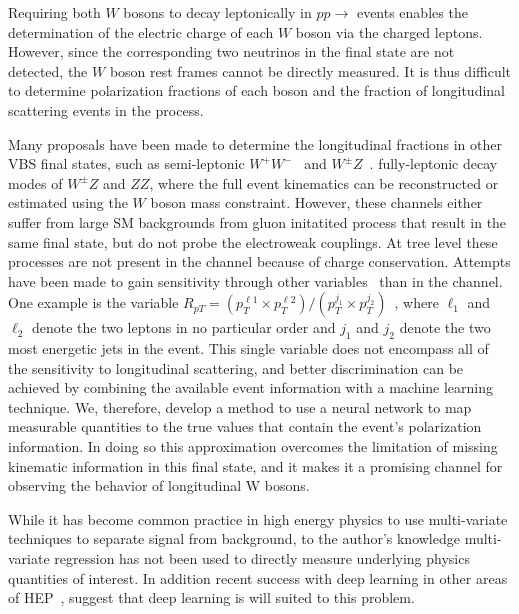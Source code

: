 Requiring both $W$ bosons to decay leptonically in  $pp
\to$ \ssWW events enables the determination of the electric charge of
each $W$ boson via the charged leptons. However, since the
corresponding two neutrinos in the final state are not detected, the
$W$ boson rest frames cannot be directly measured.  It is thus
difficult to determine polarization fractions of each boson and
the fraction of longitudinal scattering events in the \ssWW process.

Many proposals have been made to determine the longitudinal fractions in other VBS final states, such as semi-leptonic
$W^+W^-$~\cite{Han:2009em} and $W^\pm Z$~\cite{VBSCuts1}.
fully-leptonic decay modes of $W^\pm Z$ and $ZZ$, where the full
event kinematics can be reconstructed or estimated using the $W$ boson mass constraint. 
However, these channels either suffer from large SM backgrounds from gluon initatited process that result in the same final state, but do not probe the electroweak couplings. At tree level these processes are not present in the \ssWW channel because of charge conservation. Attempts have been made 
to gain sensitivity through other variables~\cite{VBSCuts1,Doroba:2012pd} than \ts in the \ssWW
channel. One example is the variable $R_{pT}=(p_{T}^{\ell 1} \times
p_{T}^{\ell 2}) / (p_T^{j_1} \times p_T^{j_2})$~\cite{Doroba:2012pd},
where $\ell_1$ and $\ell_2$ denote the two leptons in no particular
order and $j_1$ and $j_2$ denote the two most energetic jets in the
event. This single variable does not encompass all of the
sensitivity to longitudinal scattering, and better discrimination can
be achieved by combining the available event information with a
machine learning technique. We, therefore, develop a method to use a
neural network to map measurable quantities to the true \cts values
that contain the event's polarization information. In doing so this
approximation overcomes the limitation of missing kinematic information
in this final state, and it makes it a promising channel for observing
the behavior of longitudinal W bosons.
 
While it has become common practice in high energy physics to use
multi-variate techniques to separate signal from background, to the
author's knowledge multi-variate regression has not been used to
directly measure underlying physics quantities of interest.
In addition recent success with deep learning in other areas of
HEP~\cite{Baldi:2014kfa,Baldi:2014pta}, suggest that deep learning
is will suited to this problem.

